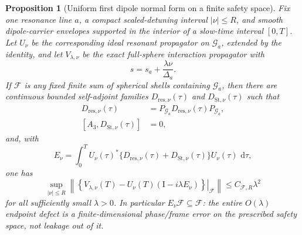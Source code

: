 \documentclass[11pt]{article}
\newtheorem{proposition}[theorem]{Proposition}
\theoremstyle{remark}
\newcommand{\Id}{\mathrm I}
\newcommand{\dd}{\,\mathrm d}
\begin{document}
\begin{proposition}[Uniform first dipole normal form on a finite safety space]
\label{prop:dipole-first-normal-form}
Fix one resonance line $a$, a compact scaled-detuning interval
$|\nu|\leq R$, and smooth dipole-carrier envelopes supported in the interior
of a slow-time interval $[0,T]$.  Let $U_\nu$ be the corresponding ideal
resonant propagator on $\mathcal G_a$, extended by the identity, and let
$V_{\lambda,\nu}$ be the exact full-sphere interaction propagator with
\[
 s=s_a+\frac{\lambda\nu}{\Delta_a}.
\]
If $\mathcal F$ is any fixed finite sum of spherical shells containing
$\mathcal G_a$, then there are continuous bounded self-adjoint families
$D_{\mathrm{res},\nu}(\tau)$ and
$D_{\mathrm{St},\nu}(\tau)$ such that
\begin{align}
 D_{\mathrm{res},\nu}(\tau)
 &=P_{\mathcal G_a}D_{\mathrm{res},\nu}(\tau)P_{\mathcal G_a},
 \label{eq:dipole-resonant-first-correction}\\
 [A_3,D_{\mathrm{St},\nu}(\tau)]&=0,
 \label{eq:dipole-stark-first-correction}
\end{align}
and, with
\begin{equation}
 E_\nu=
 \int_0^T U_\nu(\tau)^*
 \{D_{\mathrm{res},\nu}(\tau)+D_{\mathrm{St},\nu}(\tau)\}
 U_\nu(\tau)\,\dd\tau ,
 \label{eq:dipole-endpoint-first-correction}
\end{equation}
one has
\begin{equation}
 \sup_{|\nu|\leq R}
 \left\|
 \left.
 \left\{
 V_{\lambda,\nu}(T)
 -U_\nu(T)(\Id-i\lambda E_\nu)
 \right\}
 \right|_{\mathcal F}
 \right\|
 \leq C_{\mathcal F,R}\lambda^2
 \label{eq:dipole-first-normal-form-endpoint}
\end{equation}
for all sufficiently small $\lambda>0$.
In particular $E_\nu\mathcal F\subseteq\mathcal F$: the entire
$O(\lambda)$ endpoint defect is a finite-dimensional phase/frame error on
the prescribed safety space, not leakage out of it.
\end{proposition}
\end{document}
